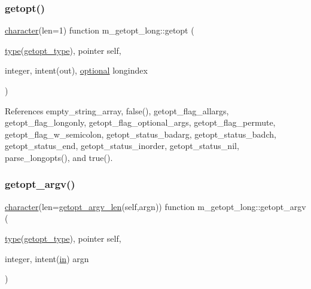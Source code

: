 \subsubsection{\texorpdfstring{getopt()}{getopt()}}
{\footnotesize\ttfamily \hyperlink{option__stopwatch_83_8txt_abd4b21fbbd175834027b5224bfe97e66}{character}(len=1) function m\+\_\+getopt\+\_\+long\+::getopt (\begin{DoxyParamCaption}\item[{\hyperlink{stop__watch_83_8txt_a70f0ead91c32e25323c03265aa302c1c}{type}(\hyperlink{structm__getopt__long_1_1getopt__type}{getopt\+\_\+type}), pointer}]{self,  }\item[{integer, intent(out), \hyperlink{option__stopwatch_83_8txt_aa4ece75e7acf58a4843f70fe18c3ade5}{optional}}]{longindex }\end{DoxyParamCaption})}



References empty\+\_\+string\+\_\+array, false(), getopt\+\_\+flag\+\_\+allargs, getopt\+\_\+flag\+\_\+longonly, getopt\+\_\+flag\+\_\+optional\+\_\+args, getopt\+\_\+flag\+\_\+permute, getopt\+\_\+flag\+\_\+w\+\_\+semicolon, getopt\+\_\+status\+\_\+badarg, getopt\+\_\+status\+\_\+badch, getopt\+\_\+status\+\_\+end, getopt\+\_\+status\+\_\+inorder, getopt\+\_\+status\+\_\+nil, parse\+\_\+longopts(), and true().

\mbox{\label{namespacem__getopt__long_a7bd7b84d1aeda27b57f33b81a93ef1c1}} 
\subsubsection{\texorpdfstring{getopt\+\_\+argv()}{getopt\_argv()}}
{\footnotesize\ttfamily \hyperlink{option__stopwatch_83_8txt_abd4b21fbbd175834027b5224bfe97e66}{character}(len=\hyperlink{namespacem__getopt__long_a379b13093de969a83f29283c3cce3c7a}{getopt\+\_\+argv\+\_\+len}(self,argn)) function m\+\_\+getopt\+\_\+long\+::getopt\+\_\+argv (\begin{DoxyParamCaption}\item[{\hyperlink{stop__watch_83_8txt_a70f0ead91c32e25323c03265aa302c1c}{type}(\hyperlink{structm__getopt__long_1_1getopt__type}{getopt\+\_\+type}), pointer}]{self,  }\item[{integer, intent(\hyperlink{M__journal_83_8txt_afce72651d1eed785a2132bee863b2f38}{in})}]{argn }\end{DoxyParamCaption})}

